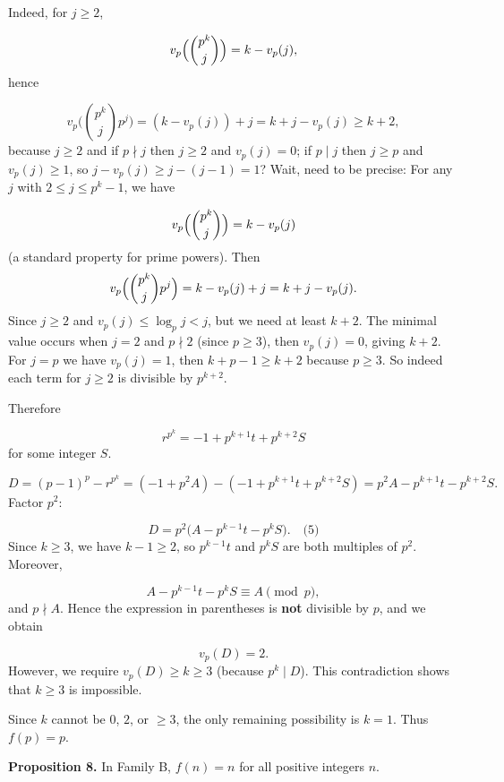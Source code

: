 Indeed, for \(j\ge2\),\par
\[
    v_{p}\Bigl(\binom{p^{k}}{j}\Bigr) = k - v_{p}(j),
    \]
hence\par
\[
    v_{p}\biggl(\binom{p^{k}}{j}p^{j}\biggr) = (k - v_{p}(j)) + j = k + j - v_{p}(j) \ge k+2,
    \]
because \(j\ge2\) and if \(p\nmid j\) then \(j\ge2\) and \(v_{p}(j)=0\); if \(p\mid j\) then \(j\ge p\) and \(v_{p}(j)\ge1\), so \(j - v_{p}(j) \ge j- (j-1) =1\)? Wait, need to be precise: For any \(j\) with \(2\le j\le p^{k}-1\), we have\par
\[
    v_{p}\Bigl(\binom{p^{k}}{j}\Bigr) = k - v_{p}(j)
\]
(a standard property for prime powers). Then
\[
    v_{p}\Bigl(\binom{p^{k}}{j} p^{j}\Bigr) = k - v_{p}(j) + j = k + j - v_{p}(j).
    \]
Since \(j\ge2\) and \(v_{p}(j)\le \log_{p} j < j\), but we need at least \(k+2\). The minimal value occurs when \(j=2\) and \(p\nmid 2\) (since \(p\ge3\)), then \(v_{p}(j)=0\), giving \(k+2\). For \(j=p\) we have \(v_{p}(j)=1\), then \(k + p - 1 \ge k+2\) because \(p\ge3\). So indeed each term for \(j\ge2\) is divisible by \(p^{k+2}\).\par
Therefore\par
\[
  r^{p^{k}} = -1 + p^{k+1} t + p^{k+2} S
  \]
for some integer \(S\).\par
{}
\[
  D = (p-1)^{p} - r^{p^{k}} = (-1 + p^{2} A) - (-1 + p^{k+1} t + p^{k+2} S) = p^{2} A - p^{k+1} t - p^{k+2} S.
  \]
Factor \(p^{2}\):\par
\[
  D = p^{2}\bigl(A - p^{k-1} t - p^{k} S\bigr). \quad\text{(5)}
  \]
Since \(k\ge3\), we have \(k-1\ge2\), so \(p^{k-1} t\) and \(p^{k} S\) are both multiples of \(p^{2}\). Moreover,\par
\[
  A - p^{k-1} t - p^{k} S \equiv A \pmod p,
  \]
and \(p\nmid A\). Hence the expression in parentheses is \textbf{not} divisible by \(p\), and we obtain\par
\[
  v_{p}(D) = 2.
  \]
However, we require \(v_{p}(D) \ge k \ge 3\) (because \(p^{k}\mid D\)). This contradiction shows that \(k\ge3\) is impossible.\par
\smallskip
Since \(k\) cannot be \(0\), \(2\), or \(\ge3\), the only remaining possibility is \(k=1\). Thus \(f(p)=p\).\par
\textbf{Proposition 8.} In Family B, \(f(n)=n\) for all positive integers \(n\).\par
